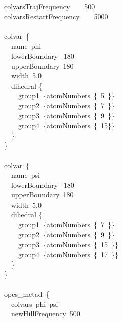 \begin{cvexampleinput}
\-colvarsTrajFrequency~~~~500         \\
\-colvarsRestartFrequency~~~~5000     \\
                                      \\
\-colvar~\{                           \\
\-\-~~name~phi                        \\
\-\-~~lowerBoundary~-180              \\
\-\-~~upperBoundary~180               \\
\-\-~~width~5.0                       \\
\-\-~~dihedral \{                     \\
\-\-~~~~group1~\{atomNumbers~\{~5~\}\}\\
\-\-~~~~group2~\{atomNumbers~\{~7~\}\}\\
\-\-~~~~group3~\{atomNumbers~\{~9~\}\}\\
\-\-~~~~group4~\{atomNumbers~\{~15\}\}\\
\-\-~~\}                              \\
\-\}                                  \\
                                      \\
\-colvar~\{                           \\
\-~~name~psi                          \\
\-~~lowerBoundary~-180                \\
\-~~upperBoundary~180                 \\
\-~~width~5.0                         \\
\-~~dihedral \{                       \\
\-~~~~group1~\{atomNumbers~\{~7~\}\}  \\
\-~~~~group2~\{atomNumbers~\{~9~\}\}  \\
\-~~~~group3~\{atomNumbers~\{~15~\}\} \\
\-~~~~group4~\{atomNumbers~\{~17~\}\} \\
\-~~\}                                \\
\-\}                                  \\
                                      \\
\-opes\_metad~\{                      \\
\-~~colvars~phi~psi                   \\
\-~~newHillFrequency~500              \\

\end{cvexampleinput}
